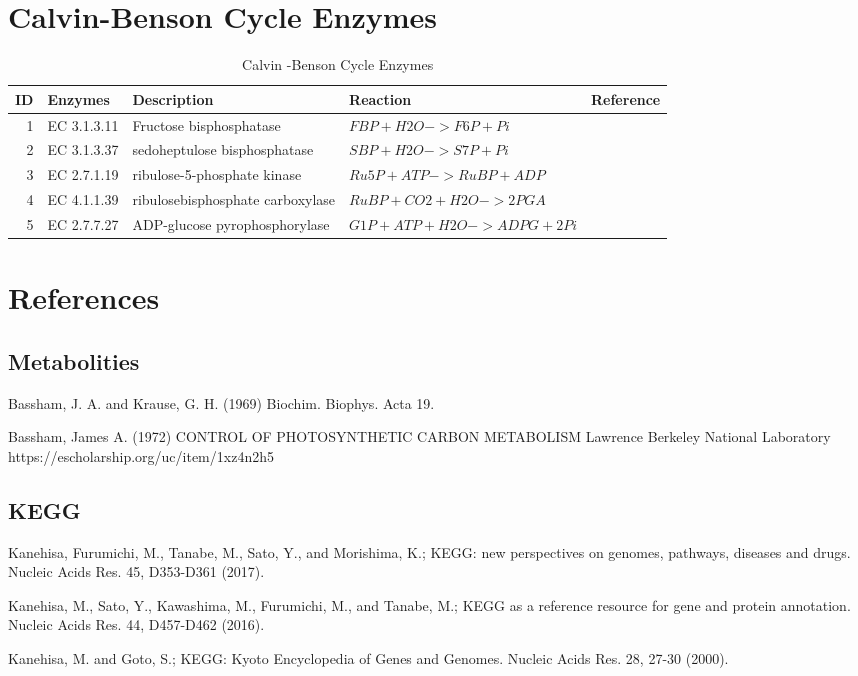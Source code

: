 \section{Calvin-Benson Cycle Enzymes}

\centering
\begin{table}[H]\footnotesize
	\caption{Calvin -Benson Cycle Enzymes}
	\begin{tabular}{rp{1cm}p{2cm}p{3cm}p{1cm}}
		\hline
		ID & Enzymes & Description & Reaction & Reference \\
		\hline
		1 & EC 3.1.3.11 & Fructose bisphosphatase & $FBP + H2O->F6P + Pi$ &\cite{key4000} \\
		2 & EC 3.1.3.37 &  sedoheptulose bisphosphatase &$SBP + H2O->S7P + Pi$ &\cite{key4000} \\
		3 & EC 2.7.1.19 & ribulose-5-phosphate kinase & $Ru5P + ATP->RuBP + ADP$ & \cite{key4000} \\
		4 & EC 4.1.1.39 &  ribulosebisphosphate carboxylase & $RuBP + CO2+ H2O->2 PGA$ & \cite{key4000} \\
		5 & EC 2.7.7.27 &  ADP-glucose pyrophosphorylase  &$G1P + ATP + H2O->ADPG + 2 Pi$ & \cite{key4000} \\
		\hline
	\end{tabular}
\end{table}
\raggedright


\section{References}
\subsection{Metabolities}

 Bassham, J. A.  and Krause, G. H. (1969) 
\newblock Biochim. Biophys. Acta 19. 

Bassham, James A. (1972)
\newblock CONTROL OF PHOTOSYNTHETIC CARBON METABOLISM
\newblock Lawrence Berkeley National Laboratory https://escholarship.org/uc/item/1xz4n2h5


\subsection{KEGG}

 Kanehisa, Furumichi, M., Tanabe, M., Sato, Y., and Morishima, K.; 
\newblock KEGG: new perspectives on genomes, pathways, diseases and drugs. 
\newblock Nucleic Acids Res. 45, D353-D361 (2017).

 Kanehisa, M., Sato, Y., Kawashima, M., Furumichi, M., and Tanabe, M.; 
\newblock KEGG as a reference resource for gene and protein annotation. 
\newblock Nucleic Acids Res. 44, D457-D462 (2016).

 Kanehisa, M. and Goto, S.; 
\newblock KEGG: Kyoto Encyclopedia of Genes and Genomes. 
\newblock Nucleic Acids Res. 28, 27-30 (2000). 
